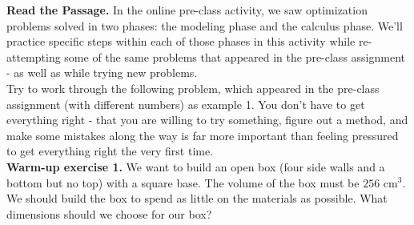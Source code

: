 \documentclass[10pt]{article}
\begin{document}
\pagestyle{otherpages}
\thispagestyle{firstpage}
{\bf\color{blue}Read the Passage.} In the online pre-class activity, we saw optimization problems solved in two phases: the modeling phase and the calculus phase. We'll practice specific steps within each of those phases in this activity while re-attempting some of the same problems that appeared in the pre-class assignment - as well as while trying new problems.\\

Try to work through the following problem, which appeared in the pre-class assignment (with different numbers) as example 1. You don't have to get everything right - that you are willing to try something, figure out a method, and make some mistakes along the way is far more important than feeling pressured to get everything right the very first time.\\

{\bf\color{blue}Warm-up exercise 1.} We want to build an open box (four side walls and a bottom but no top) with a square base. The volume of the box must be $256$ cm$^3$. We should build the box to spend as little on the materials as possible. What dimensions should we choose for our box?\\
\end{document}
